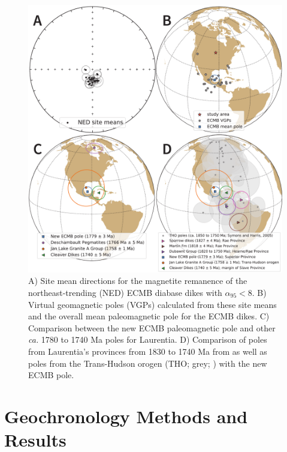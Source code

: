 \documentclass[draft]{agujournal2019}
\begin{document}
\begin{figure}[!ht]
\noindent\includegraphics[width=\textwidth]{./figures/paleomag_site_directions_pole.pdf}
\caption{\small{A) Site mean directions for the magnetite remanence of the northeast-trending (NED) ECMB diabase dikes with $\alpha_{95}<8$\textdegree. B) Virtual geomagnetic poles (VGPs) calculated from these site means and the overall mean paleomagnetic pole for the ECMB dikes. C) Comparison between the new ECMB paleomagnetic pole and other \textit{ca.} 1780 to 1740 Ma poles for Laurentia. D) Comparison of poles from Laurentia's provinces from 1830 to 1740 Ma from  as well as poles from the Trans-Hudson orogen (THO; grey; ) with the new ECMB pole.}}
\label{fig:site_means}
\end{figure}

\section{Geochronology Methods and Results}
\end{document}
